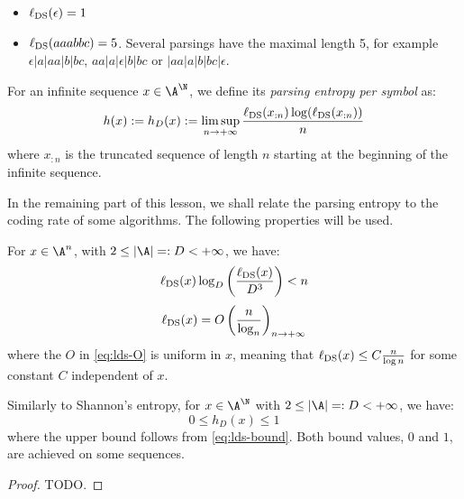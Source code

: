 \documentclass[toc, titlepaged]{../cs-classes/cs-classes}
\newcommand*{\lds}{\ell_{\textnormal{DS}}}
\begin{document}
\begin{example}
    \leavevmode
    \begin{itemize}
        \item $\lds(\epsilon) = 1$
        \item $\lds(aaabbc) = 5$. Several parsings have the maximal length 5, for example $\epsilon|a|aa|b|bc$, $aa|a|\epsilon|b|bc$ or $|aa|a|b|bc|\epsilon$.
    \end{itemize}
\end{example}

\begin{definition}
    For an infinite sequence $x\in\A^\N$, we define its \emph{parsing entropy per symbol} as:
    \begin{equation*}
        h(x):=h_D(x) := \limsup_{n\to+\infty} \frac{\lds(x_{:n}) \log(\lds(x_{:n}))}{n}
    \end{equation*}
    where $x_{:n}$ is the truncated sequence of length $n$ starting at the beginning of the infinite sequence.
\end{definition}
In the remaining part of this lesson, we shall relate the parsing entropy to the coding rate of some algorithms. The following properties will be used.

\begin{lemma}
    For $x\in\A^n$, with $2\leq|\A|=:D<+\infty$, we have:
    \begin{equation}
        \label{eq:lds-bound}
        \lds(x)\log_D\left(\frac{\lds(x)}{D^3}\right) < n
    \end{equation}
    \begin{equation}
        \label{eq:lds-O}
        \lds(x) = O\left(\frac{n}{\log_n}\right)_{n\to+\infty}
    \end{equation}
    where the $O$ in \eqref{eq:lds-O} is uniform in $x$, meaning that $\lds(x) \leq C \frac{n}{\log n}$ for some constant $C$ independent of $x$.
\end{lemma}

\begin{corollary}
    Similarly to Shannon's entropy, for $x\in\A^\N$ with $2\leq|\A|=:D<+\infty$, we have:
    \begin{equation}
        0\leq h_D(x) \leq 1
    \end{equation}
    where the upper bound follows from \eqref{eq:lds-bound}. Both bound values, $0$ and $1$, are achieved on some sequences.
\end{corollary}
\begin{proof}
    TODO.
\end{proof}
\end{document}
